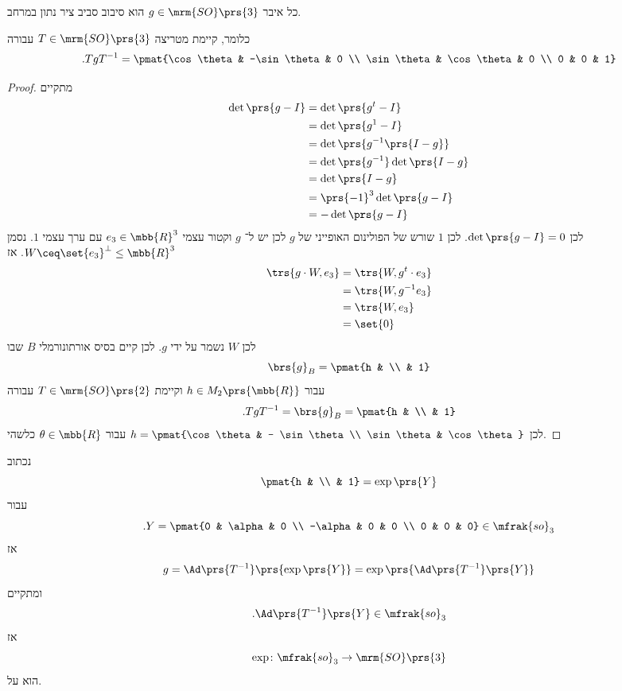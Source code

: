 \documentclass[10pt, twoside]{book}
\begin{document}
\begin{theorem}
כל איבר
$g \in \mrm{SO}\prs{3}$
הוא סיבוב סביב ציר נתון במרחב.

כלומר, קיימת מטריצה
$T \in \mrm{SO}\prs{3}$
עבורה
\[\text{.} TgT^{-1} = \pmat{\cos \theta & -\sin\theta & 0 \\ \sin \theta & \cos \theta & 0 \\ 0 & 0 & 1}\]
\end{theorem}

\begin{proof}
מתקיים
\begin{align*}
\det\prs{g - I} &=
\det\prs{g^t - I}
\\&=
\det\prs{g^1 - I}
\\&=
\det\prs{g^{-1}\prs{I-g}}
\\&=
\det\prs{g^{-1}} \det\prs{I - g}
\\&=
\det\prs{I - g}
\\&=
\prs{-1}^3 \det\prs{g-I}
\\&=
-\det\prs{g-I}
\end{align*}
לכן
$\det\prs{g-I} = 0$.
לכן
$1$
שורש של הפולינום האופייני של
$g$
לכן יש ל־%
$g$
וקטור עצמי
$e_3 \in \mbb{R}^3$
עם ערך עצמי
$1$.
נסמן
$W \ceq \set{e_3}^\perp \leq \mbb{R}^3$.
אז
\begin{align*}
\trs{g \cdot W, e_3} &=
\trs{W, g^t \cdot e_3}
\\&=
\trs{W, g^{-1} e_3}
\\&=
\trs{W, e_3}
\\&=
\set{0}
\end{align*}
לכן
$W$
נשמר על ידי
$g$.
לכן קיים בסיס אורתונורמלי
$B$
שבו
\[\brs{g}_B = \pmat{h & \\ & 1}\]
עבור
$h \in M_2\prs{\mbb{R}}$
וקיימת
$T \in \mrm{SO}\prs{2}$
עבורה
\[\text{.} T g T^{-1} = \brs{g}_B = \pmat{h & \\ & 1}\]
לכן
$h = \pmat{\cos \theta & - \sin\theta \\ \sin \theta & \cos\theta}$
עבור
$\theta \in \mbb{R}$
כלשהי.
\end{proof}

\begin{remark}
נכתוב
\[\pmat{h & \\ & 1} = \exp\prs{Y}\]
עבור
\[\text{.} Y = \pmat{0 & \alpha & 0 \\ -\alpha & 0 & 0 \\ 0 & 0 & 0} \in \mfrak{so}_3\]
אז
\[g = \Ad\prs{T^{-1}}\prs{\exp\prs{Y}} = \exp\prs{\Ad\prs{T^{-1}}\prs{Y}}\]
ומתקיים
\[\text{.} \Ad\prs{T^{-1}}\prs{Y} \in \mfrak{so}_3\]
אז
\[\exp \colon \mfrak{so}_3\to\mrm{SO}\prs{3}\]
הוא על.
\end{remark}
\end{document}
